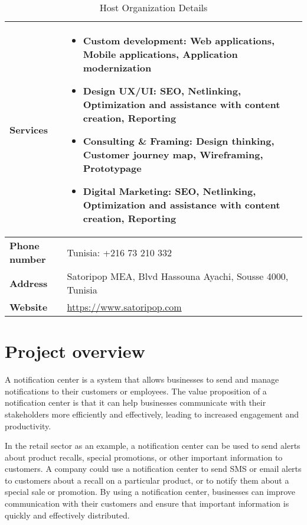 \begin{table}[hbt!]
    \centering
    \begin{tabular}{ | m{} | m{} | }
        \hline
        \textbf{Services}     &
        \vspace*{.5cm}
        \begin{itemize}[leftmargin=0.5cm]
            \item \textbf{Custom development:} Web applications, Mobile applications, Application modernization
            \item \textbf{Design UX/UI:} SEO, Netlinking, Optimization and assistance with content creation, Reporting
            \item \textbf{Consulting \& Framing:} Design thinking, Customer journey map, Wireframing, Prototypage
            \item \textbf{Digital Marketing:} SEO, Netlinking, Optimization and assistance with content creation, Reporting
        \end{itemize} \\
        \hline
        \textbf{Phone number} & Tunisia: +216 73 210 332                                                               \\
        \hline
        \textbf{Address}      & Satoripop MEA, Blvd Hassouna Ayachi, Sousse 4000, Tunisia                              \\
        \hline
        \textbf{Website}      & \url{https://www.satoripop.com}                                                        \\
        \hline
    \end{tabular}
    \caption{Host Organization Details}
\end{table}

\section{Project overview}
A notification center is a system that allows businesses to send and manage notifications
to their customers or employees. The value proposition of a notification center is that it
can help businesses communicate with their stakeholders more efficiently and
effectively, leading to increased engagement and productivity.

In the retail sector as an example, a notification center can be used to send alerts about product
recalls, special promotions, or other important information to customers. A company could use a
notification center to send SMS or email alerts to customers about a recall on a particular product,
or to notify them about a special sale or promotion. By using a notification center, businesses can
improve communication with their customers and ensure that important information is quickly and
effectively distributed.

